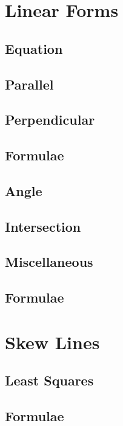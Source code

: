 \documentclass[journal]{IEEEtran}
\begin{document}
\section{Linear Forms}
\subsection{Equation }

\subsection{Parallel}

\subsection{Perpendicular}

\subsection{Formulae}

\subsection{Angle}

\subsection{Intersection}

\subsection{Miscellaneous }

\subsection{Formulae}

\newpage
\section{Skew Lines}
\subsection{Least Squares}

\subsection{Formulae}

\end{document}
